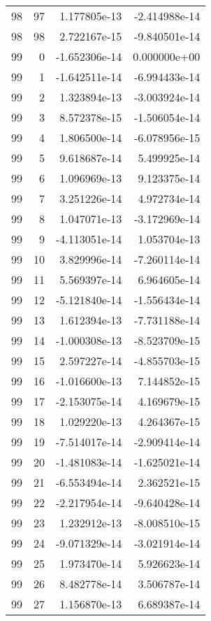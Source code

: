 \begin{tabular}{rrrr}
  98 &   97 &  1.177805e-13 & -2.414988e-14 \\
  98 &   98 &  2.722167e-15 & -9.840501e-14 \\
  99 &    0 & -1.652306e-14 &  0.000000e+00 \\
  99 &    1 & -1.642511e-14 & -6.994433e-14 \\
  99 &    2 &  1.323894e-13 & -3.003924e-14 \\
  99 &    3 &  8.572378e-15 & -1.506054e-14 \\
  99 &    4 &  1.806500e-14 & -6.078956e-15 \\
  99 &    5 &  9.618687e-14 &  5.499925e-14 \\
  99 &    6 &  1.096969e-13 &  9.123375e-14 \\
  99 &    7 &  3.251226e-14 &  4.972734e-14 \\
  99 &    8 &  1.047071e-13 & -3.172969e-14 \\
  99 &    9 & -4.113051e-14 &  1.053704e-13 \\
  99 &   10 &  3.829996e-14 & -7.260114e-14 \\
  99 &   11 &  5.569397e-14 &  6.964605e-14 \\
  99 &   12 & -5.121840e-14 & -1.556434e-14 \\
  99 &   13 &  1.612394e-13 & -7.731188e-14 \\
  99 &   14 & -1.000308e-13 & -8.523709e-15 \\
  99 &   15 &  2.597227e-14 & -4.855703e-15 \\
  99 &   16 & -1.016600e-13 &  7.144852e-15 \\
  99 &   17 & -2.153075e-14 &  4.169679e-15 \\
  99 &   18 &  1.029220e-13 &  4.264367e-15 \\
  99 &   19 & -7.514017e-14 & -2.909414e-14 \\
  99 &   20 & -1.481083e-14 & -1.625021e-14 \\
  99 &   21 & -6.553494e-14 &  2.362521e-15 \\
  99 &   22 & -2.217954e-14 & -9.640428e-14 \\
  99 &   23 &  1.232912e-13 & -8.008510e-15 \\
  99 &   24 & -9.071329e-14 & -3.021914e-14 \\
  99 &   25 &  1.973470e-14 &  5.926623e-14 \\
  99 &   26 &  8.482778e-14 &  3.506787e-14 \\
  99 &   27 &  1.156870e-13 &  6.689387e-14 \\

\end{tabular}
